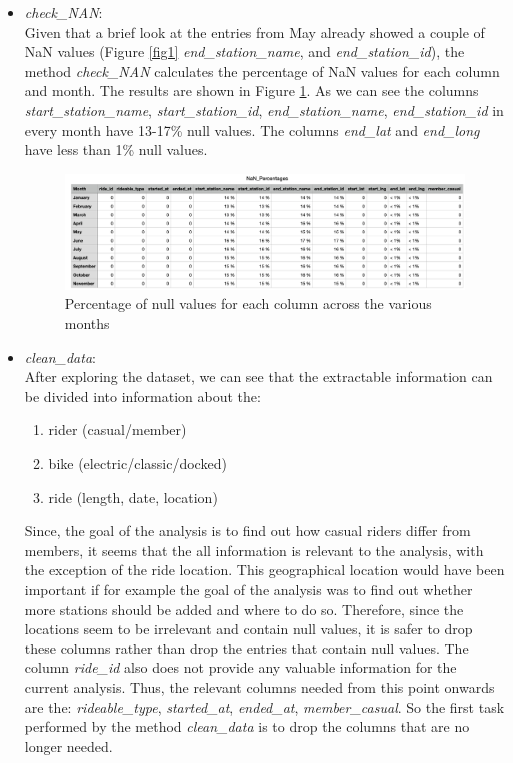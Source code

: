 \documentclass[12pt]{article}
\begin{document}
\begin{itemize}
	\item \textit{check\_NAN}:\\
	Given that a brief look at the entries from May already showed a couple of NaN values (Figure \ref{fig1} \textit{end\_station\_name}, and \textit{end\_station\_id}), the method \textit{check\_NAN} calculates the percentage of NaN values for each column and month. The results are shown in Figure \ref{fig4}. As we can see the columns \textit{start\_station\_name}, \textit{start\_station\_id}, \textit{end\_station\_name}, \textit{end\_station\_id} in every month have 13-17\% null values. The columns \textit{end\_lat} and \textit{end\_long} have less than 1\% null values. 
	
	\begin{figure}[h]
	\includegraphics[width=6.5 in, height = 2.3 in]{imgNAN.png}
	\caption{Percentage of null values for each column across the various months}
	\label{fig4}
	\end{figure}
	
	\item \textit{clean\_data}:\\
	After exploring the dataset, we can see that the extractable information can be divided into information about the:
	\begin{enumerate} 
	\item rider (casual/member)
	\item bike (electric/classic/docked)
	\item ride (length, date, location)
	\end{enumerate}
Since, the goal of the analysis is to find out how casual riders differ from members, it seems that the all information is relevant to the analysis, with the exception of the ride location. This geographical location would have been important if for example the goal of the analysis was to find out whether more stations should be added and where to do so. Therefore, since the locations seem to be irrelevant and contain null values, it is safer to drop these columns rather than drop the entries that contain null values. The column \textit{ride\_id} also does not provide any valuable information for the current analysis. Thus, the relevant columns needed from this point onwards are the: \textit{rideable\_type}, \textit{started\_at}, \textit{ended\_at}, \textit{member\_casual}. So the first task performed by the method \textit{clean\_data} is to drop the columns that are no longer needed. 



\end{itemize}
\end{document}
